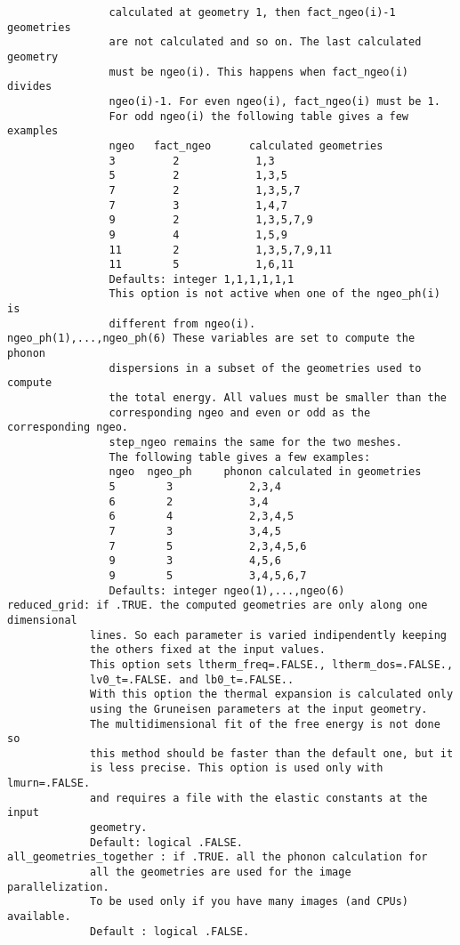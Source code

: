 \documentclass[12pt,a4paper]{article}
\begin{document}
\begin{verbatim}
                calculated at geometry 1, then fact_ngeo(i)-1 geometries 
                are not calculated and so on. The last calculated geometry 
                must be ngeo(i). This happens when fact_ngeo(i) divides
                ngeo(i)-1. For even ngeo(i), fact_ngeo(i) must be 1.
                For odd ngeo(i) the following table gives a few examples
                ngeo   fact_ngeo      calculated geometries
                3         2            1,3
                5         2            1,3,5
                7         2            1,3,5,7
                7         3            1,4,7
                9         2            1,3,5,7,9
                9         4            1,5,9
                11        2            1,3,5,7,9,11
                11        5            1,6,11
                Defaults: integer 1,1,1,1,1,1
                This option is not active when one of the ngeo_ph(i) is 
                different from ngeo(i).
ngeo_ph(1),...,ngeo_ph(6) These variables are set to compute the phonon
                dispersions in a subset of the geometries used to compute
                the total energy. All values must be smaller than the 
                corresponding ngeo and even or odd as the corresponding ngeo. 
                step_ngeo remains the same for the two meshes.
                The following table gives a few examples:
                ngeo  ngeo_ph     phonon calculated in geometries
                5        3            2,3,4
                6        2            3,4
                6        4            2,3,4,5
                7        3            3,4,5
                7        5            2,3,4,5,6
                9        3            4,5,6
                9        5            3,4,5,6,7
                Defaults: integer ngeo(1),...,ngeo(6)
reduced_grid: if .TRUE. the computed geometries are only along one dimensional 
             lines. So each parameter is varied indipendently keeping 
             the others fixed at the input values. 
             This option sets ltherm_freq=.FALSE., ltherm_dos=.FALSE., 
             lv0_t=.FALSE. and lb0_t=.FALSE..
             With this option the thermal expansion is calculated only
             using the Gruneisen parameters at the input geometry.
             The multidimensional fit of the free energy is not done so
             this method should be faster than the default one, but it
             is less precise. This option is used only with lmurn=.FALSE. 
             and requires a file with the elastic constants at the input 
             geometry.
             Default: logical .FALSE.
all_geometries_together : if .TRUE. all the phonon calculation for
             all the geometries are used for the image parallelization.
             To be used only if you have many images (and CPUs) available.
             Default : logical .FALSE.
\end{verbatim}
\end{document}

